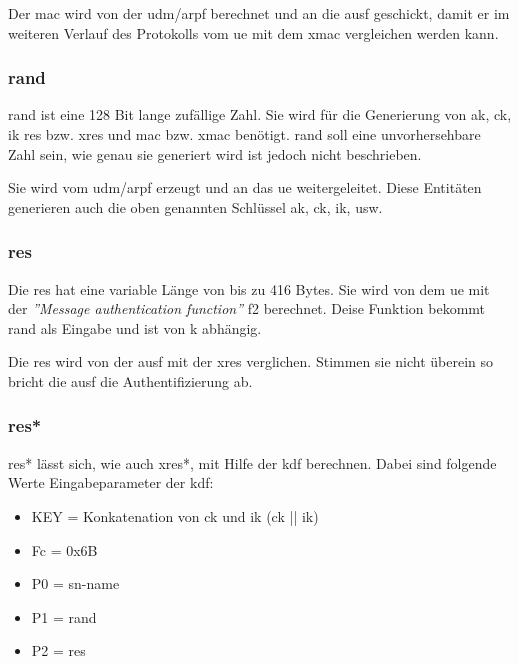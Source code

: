 Der \gls{mac} wird von der \gls{udm}/\gls{arpf} berechnet und an die \gls{ausf} geschickt, damit er im weiteren Verlauf des Protokolls vom \gls{ue} mit dem \gls{xmac} vergleichen werden kann.

\subsubsection{\gls{rand}}
\gls{rand} ist eine 128 Bit lange zuf\"allige Zahl. %
Sie wird f\"ur die Generierung von \gls{ak}, \gls{ck}, \gls{ik} \gls{res} bzw. \gls{xres} und \gls{mac} bzw. \gls{xmac} ben\"otigt. 
\gls{rand} soll eine unvorhersehbare Zahl sein, wie genau sie generiert wird ist jedoch nicht beschrieben. %

Sie wird vom \gls{udm}/\gls{arpf} erzeugt und an das \gls{ue} weitergeleitet. Diese Entit\"aten generieren auch die oben genannten Schl\"ussel \gls{ak}, \gls{ck}, \gls{ik}, usw.

\subsubsection{\gls{res}}
Die \gls{res} hat eine variable L\"ange von bis zu 416 Bytes. %
Sie wird von dem \gls{ue} mit der \textit{''Message authentication function''} f2 berechnet.
Deise Funktion bekommt \gls{rand} als Eingabe und ist von \gls{k} abh\"angig. %

Die \gls{res} wird von der \gls{ausf} mit der \gls{xres} verglichen.
Stimmen sie nicht \"uberein so bricht die \gls{ausf} die Authentifizierung ab. %

\subsubsection{\gls{res*}}
\gls{res*} l\"asst sich, wie auch \gls{xres*}, mit Hilfe der \gls{kdf} berechnen.
Dabei sind folgende Werte Eingabeparameter der \gls{kdf}: %
\begin{itemize}
\item KEY = Konkatenation von \gls{ck} und \gls{ik} (\gls{ck} || \gls{ik})
\item Fc = 0x6B
\item P0 = \gls{sn-name}
\item P1 = \gls{rand}
\item P2 = \gls{res}
\end{itemize}

